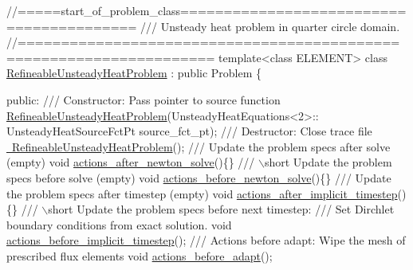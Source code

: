  
\begin{DoxyCodeInclude}
\textcolor{comment}{//=====start\_of\_problem\_class=========================================}
\textcolor{comment}{/// Unsteady heat problem in quarter circle domain.}
\textcolor{comment}{}\textcolor{comment}{//====================================================================}
\textcolor{keyword}{template}<\textcolor{keyword}{class} ELEMENT>
\textcolor{keyword}{class }\hyperlink{classRefineableUnsteadyHeatProblem}{RefineableUnsteadyHeatProblem} : \textcolor{keyword}{public} Problem
\{

\textcolor{keyword}{public}:
\textcolor{comment}{}
\textcolor{comment}{ /// Constructor: Pass pointer to source function}
\textcolor{comment}{} \hyperlink{classRefineableUnsteadyHeatProblem_a894f3bd6c1c23c307a736de6898e4e98}{RefineableUnsteadyHeatProblem}(UnsteadyHeatEquations<2>::
                             UnsteadyHeatSourceFctPt source\_fct\_pt);
\textcolor{comment}{}
\textcolor{comment}{ /// Destructor: Close trace file}
\textcolor{comment}{} \hyperlink{classRefineableUnsteadyHeatProblem_a975e00f5e87d77b4e1bf4d50482dea2b}{~RefineableUnsteadyHeatProblem}();
\textcolor{comment}{}
\textcolor{comment}{ /// Update the problem specs after solve (empty)}
\textcolor{comment}{} \textcolor{keywordtype}{void} \hyperlink{classRefineableUnsteadyHeatProblem_ada522772b79e92a75edf3724d0a273da}{actions\_after\_newton\_solve}()\{\}
\textcolor{comment}{}
\textcolor{comment}{ /// \(\backslash\)short Update the problem specs before solve (empty)}
\textcolor{comment}{} \textcolor{keywordtype}{void} \hyperlink{classRefineableUnsteadyHeatProblem_aac1935e15c67b196e6db97dd058511b5}{actions\_before\_newton\_solve}()\{\}
\textcolor{comment}{}
\textcolor{comment}{ /// Update the problem specs after timestep (empty)}
\textcolor{comment}{} \textcolor{keywordtype}{void} \hyperlink{classRefineableUnsteadyHeatProblem_aa740f2eb1b3909100a04709b401c0b41}{actions\_after\_implicit\_timestep}()\{\}
\textcolor{comment}{}
\textcolor{comment}{ /// \(\backslash\)short Update the problem specs before next timestep: }
\textcolor{comment}{ /// Set Dirchlet boundary conditions from exact solution.}
\textcolor{comment}{} \textcolor{keywordtype}{void} \hyperlink{classRefineableUnsteadyHeatProblem_ac754f1313cd6d684c149443beb5bcf9e}{actions\_before\_implicit\_timestep}();
 \textcolor{comment}{}
\textcolor{comment}{ /// Actions before adapt: Wipe the mesh of prescribed flux elements}
\textcolor{comment}{} \textcolor{keywordtype}{void} \hyperlink{classRefineableUnsteadyHeatProblem_a4419fcea0ccbf0509f1d5dd37d8301de}{actions\_before\_adapt}();

\end{DoxyCodeInclude}
